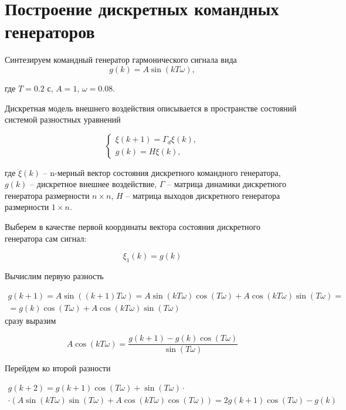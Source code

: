 \chapter{Построение дискретных командных генераторов}
\label{ch:chap3}

Синтезируем командный генератор гармонического сигнала вида 
\begin{equation}
	g(k) = A \sin (kT\omega),
\end{equation}

где $T=0.2$ с, $A=1$, $\omega =0.08$.

Дискретная модель внешнего воздействия описывается в пространстве состояний системой разностных уравнений

\begin{equation}
	\begin{cases}
		\xi (k+1) = \Gamma_d \xi (k),\\
		g(k) = H \xi (k),
	\end{cases}
\end{equation}

где $\xi(k)$ -- n-мерный вектор состояния дискретного командного генератора, $g(k)$ -- дискретное внешнее воздействие, $\Gamma$ -- матрица динамики дискретного генератора размерности $n \times n$, $H$ -- матрица выходов дискретного генератора размерности $1 \times n$.

Выберем в качестве первой координаты вектора состояния дискретного генератора сам сигнал:

\begin{equation}
	\xi_1(k) = g(k)
\end{equation}

Вычислим первую разность

\begin{multline}
	g(k+1) = A \sin ((k+1)T\omega) =  A \sin (kT\omega) \cos (T\omega) + A \cos(kT\omega) \sin(T\omega)=\\=
	g(k) \cos (T\omega) + A \cos(kT\omega) \sin(T\omega)
\end{multline}
сразу выразим

\begin{equation}
	 A \cos(kT\omega) = \frac{g(k+1)-g(k) \cos (T\omega)}{\sin(T\omega)}
\end{equation}

Перейдем ко второй разности

\begin{multline}
	g(k+2) = g(k+1) \cos (T \omega) + \sin (T \omega) \cdot \\ \cdot \left(A \sin(kT\omega) \sin(T\omega)+A \cos(kT\omega) \cos(T\omega) \right)=
	2g(k+1) \cos(T\omega) - g(k)
\end{multline}

